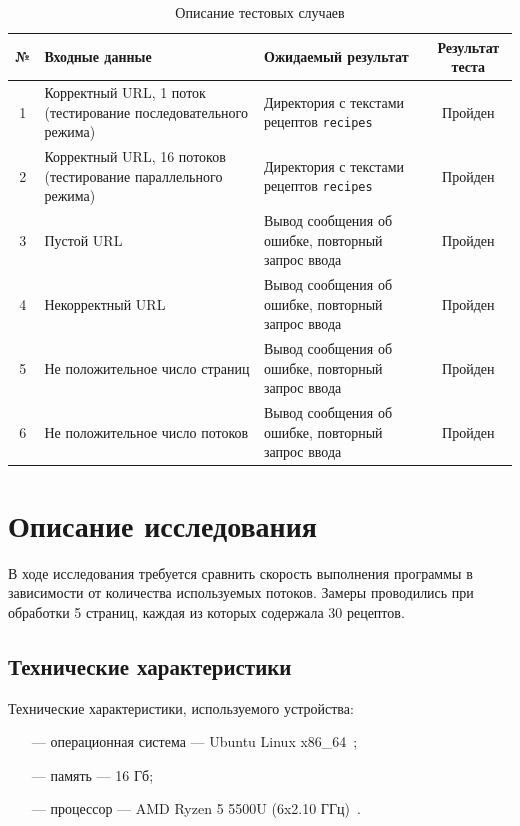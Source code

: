 \begin{table}[h!]
    \begin{center}
		\begin{threeparttable}
    \caption{Описание тестовых случаев}
    \captionsetup{justification=raggedright, singlelinecheck=false}
    \label{tbl:tests}
    \begin{tabular}{|c|p{6cm}|p{6cm}|c|}
        \hline
        \textbf{№} & \textbf{Входные данные} & \textbf{Ожидаемый результат} & \textbf{Результат теста} \\
        \hline
        1 & Корректный URL, 1 поток (тестирование последовательного режима) & Директория с текстами рецептов \texttt{recipes} & Пройден \\
        \hline
        2 & Корректный URL, 16 потоков (тестирование параллельного режима) & Директория с текстами рецептов \texttt{recipes} & Пройден \\
        \hline
        3 & Пустой URL & Вывод сообщения об ошибке, повторный запрос ввода & Пройден \\
        \hline
        4 & Некорректный URL & Вывод сообщения об ошибке, повторный запрос ввода & Пройден \\
        \hline
        5 & Не положительное число страниц & Вывод сообщения об ошибке, повторный запрос ввода & Пройден \\
        \hline
        6 & Не положительное число потоков & Вывод сообщения об ошибке, повторный запрос ввода & Пройден \\
        \hline
    \end{tabular}
    \end{threeparttable}
    \end{center}
\end{table}




\chapter{Описание исследования}
В ходе исследования требуется сравнить скорость выполнения программы в зависимости от количества используемых потоков. Замеры проводились при обработки 5 страниц, каждая из которых содержала 30 рецептов.

\section{Технические характеристики}
Технические характеристики, используемого устройства:
\begin{itemize}
    \item[---] операционная система --- Ubuntu Linux x86\_64~\cite{Ubuntu};
    \item[---] память --- 16 Гб;
    \item[---] процессор --- AMD Ryzen 5 5500U (6x2.10 ГГц)~\cite{AMD}.
\end{itemize}

